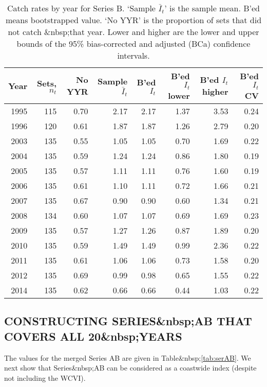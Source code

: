 \begin{table}[tbp]
\centering
\caption{Catch rates by year for Series B.
     `Sample $\bar{I}_t$' is the sample mean. B'ed means bootstrapped 
     value. `No YYR' is the proportion of sets that did not catch \spName&nbsp;that
     year. Lower and higher are the 
     lower and upper bounds of the 95\% bias-corrected and adjusted (BCa)
     confidence intervals.} 
\label{tab:bcaKeepSerB}
\begin{tabular}{rrrrrrrr}
  \hline
Year & Sets, $n_t$ & No YYR & Sample $\bar{I}_t$ & B'ed $I_t$ & B'ed $I_t$ lower & B'ed $I_t$ higher & B'ed $I_t$ CV \\ 
  \hline
1995 & 115 & 0.70 & 2.17 & 2.17 & 1.37 & 3.53 & 0.24 \\ 
  1996 & 120 & 0.61 & 1.87 & 1.87 & 1.26 & 2.79 & 0.20 \\ 
  2003 & 135 & 0.55 & 1.05 & 1.05 & 0.70 & 1.69 & 0.22 \\ 
  2004 & 135 & 0.59 & 1.24 & 1.24 & 0.86 & 1.80 & 0.19 \\ 
  2005 & 135 & 0.57 & 1.11 & 1.11 & 0.76 & 1.60 & 0.19 \\ 
  2006 & 135 & 0.61 & 1.10 & 1.11 & 0.72 & 1.66 & 0.21 \\ 
  2007 & 135 & 0.67 & 0.90 & 0.90 & 0.60 & 1.34 & 0.21 \\ 
  2008 & 134 & 0.60 & 1.07 & 1.07 & 0.69 & 1.69 & 0.23 \\ 
  2009 & 135 & 0.57 & 1.27 & 1.26 & 0.87 & 1.89 & 0.20 \\ 
  2010 & 135 & 0.59 & 1.49 & 1.49 & 0.99 & 2.36 & 0.22 \\ 
  2011 & 135 & 0.61 & 1.06 & 1.06 & 0.73 & 1.58 & 0.20 \\ 
  2012 & 135 & 0.69 & 0.99 & 0.98 & 0.65 & 1.55 & 0.22 \\ 
  2014 & 135 & 0.62 & 0.66 & 0.66 & 0.44 & 1.03 & 0.22 \\ 
   \hline
\end{tabular}
\end{table}%

\clearpage

\subsection{CONSTRUCTING SERIES&nbsp;AB THAT COVERS ALL 20&nbsp;YEARS}


The values for the merged Series AB are given in Table&nbsp;\ref{tab:serAB}. We next show that Series&nbsp;AB can be considered as a coastwide index (despite not including the WCVI). %

